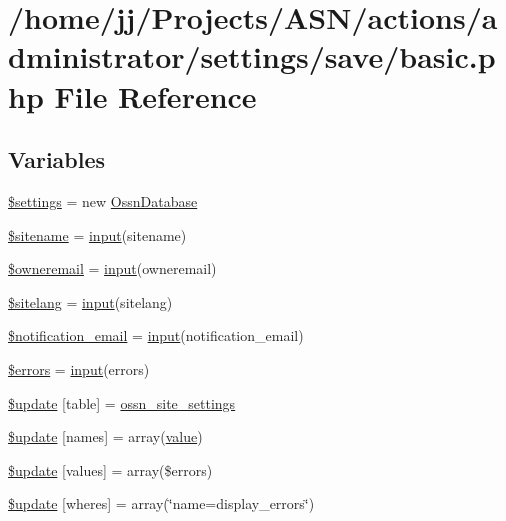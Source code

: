 \hypertarget{basic_8php}{}\section{/home/jj/\+Projects/\+A\+S\+N/actions/administrator/settings/save/basic.php File Reference}
\label{basic_8php}
\subsection*{Variables}
\begin{DoxyCompactItemize}
\item 
\hyperlink{basic_8php_ac7c3353107070daa85f641882931b358}{\$settings} = new \hyperlink{class_ossn_database}{Ossn\+Database}
\item 
\hyperlink{basic_8php_ac01e858d3012ea85184c30f6f4edd45f}{\$sitename} = \hyperlink{ossn_8lib_8input_8php_a64ebee98b041c4f75f71ed3cd73cc8ed}{input}(\textquotesingle{}sitename\textquotesingle{})
\item 
\hyperlink{basic_8php_a9985cec845427a278f1883040f17c82a}{\$owneremail} = \hyperlink{ossn_8lib_8input_8php_a64ebee98b041c4f75f71ed3cd73cc8ed}{input}(\textquotesingle{}owneremail\textquotesingle{})
\item 
\hyperlink{basic_8php_a833ed990741564193a3d27b17fb41b85}{\$sitelang} = \hyperlink{ossn_8lib_8input_8php_a64ebee98b041c4f75f71ed3cd73cc8ed}{input}(\textquotesingle{}sitelang\textquotesingle{})
\item 
\hyperlink{basic_8php_af4e8b9d68c020fc6db842a8cfa17ca68}{\$notification\+\_\+email} = \hyperlink{ossn_8lib_8input_8php_a64ebee98b041c4f75f71ed3cd73cc8ed}{input}(\textquotesingle{}notification\+\_\+email\textquotesingle{})
\item 
\hyperlink{basic_8php_ab24faf4aa647cdcee494fc48524ad4ff}{\$errors} = \hyperlink{ossn_8lib_8input_8php_a64ebee98b041c4f75f71ed3cd73cc8ed}{input}(\textquotesingle{}errors\textquotesingle{})
\item 
\hyperlink{basic_8php_aee7ba5985ddf023a93862ab77e9718f9}{\$update} \mbox{[}\textquotesingle{}table\textquotesingle{}\mbox{]} = \textquotesingle{}\hyperlink{ossn_8lib_8system_8php_a610e2045b8a86c09f777b4d82e24e34c}{ossn\+\_\+site\+\_\+settings}\textquotesingle{}
\item 
\hyperlink{basic_8php_abcf5ad2e4fef35de04bef0168cc91ddc}{\$update} \mbox{[}\textquotesingle{}names\textquotesingle{}\mbox{]} = array(\textquotesingle{}\hyperlink{fullpage_2plugin_8min_8js_ac56c57897e10f699d124e0103921aa20}{value}\textquotesingle{})
\item 
\hyperlink{basic_8php_ac82a75b4c6df37380ff77c88f041785e}{\$update} \mbox{[}\textquotesingle{}values\textquotesingle{}\mbox{]} = array(\$errors)
\item 
\hyperlink{basic_8php_aacde4479a904b32d0f24dea4e01f148c}{\$update} \mbox{[}\textquotesingle{}wheres\textquotesingle{}\mbox{]} = array(\char`\"{}name=\textquotesingle{}display\+\_\+errors\textquotesingle{}\char`\"{})
\end{DoxyCompactItemize}


